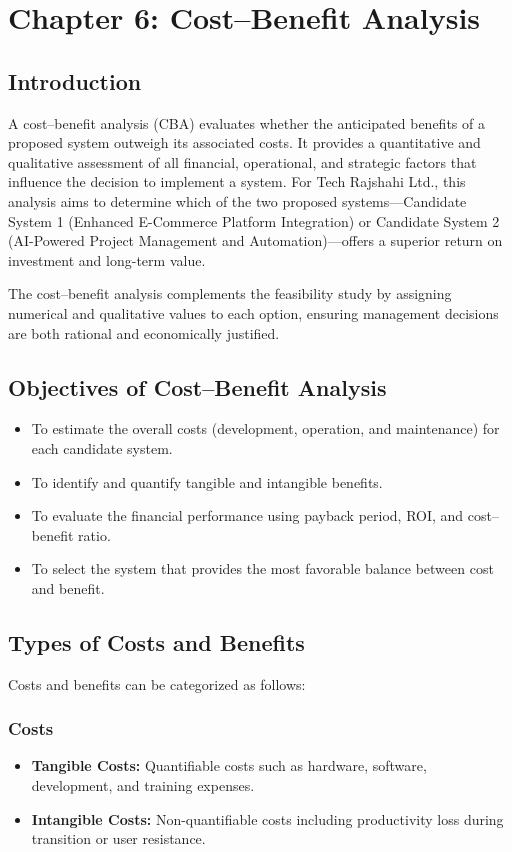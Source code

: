 \documentclass[12pt,a4paper]{article}
\newcommand{\company}[1]{#1}
\begin{document}
\newpage
\section{Chapter 6: Cost–Benefit Analysis}

\subsection{Introduction}
A cost–benefit analysis (CBA) evaluates whether the anticipated benefits of a proposed system outweigh its associated costs.  
It provides a quantitative and qualitative assessment of all financial, operational, and strategic factors that influence the decision to implement a system.  
For \company{Tech Rajshahi Ltd.}, this analysis aims to determine which of the two proposed systems—Candidate System 1 (Enhanced E-Commerce Platform Integration) or Candidate System 2 (AI-Powered Project Management and Automation)—offers a superior return on investment and long-term value.  

The cost–benefit analysis complements the feasibility study by assigning numerical and qualitative values to each option, ensuring management decisions are both rational and economically justified.

\subsection{Objectives of Cost–Benefit Analysis}
\begin{itemize}
    \item To estimate the overall costs (development, operation, and maintenance) for each candidate system.
    \item To identify and quantify tangible and intangible benefits.
    \item To evaluate the financial performance using payback period, ROI, and cost–benefit ratio.
    \item To select the system that provides the most favorable balance between cost and benefit.
\end{itemize}

\subsection{Types of Costs and Benefits}
Costs and benefits can be categorized as follows:

\subsubsection{Costs}
\begin{itemize}
    \item \textbf{Tangible Costs:} Quantifiable costs such as hardware, software, development, and training expenses.
    \item \textbf{Intangible Costs:} Non-quantifiable costs including productivity loss during transition or user resistance.
\end{itemize}
\end{document}
